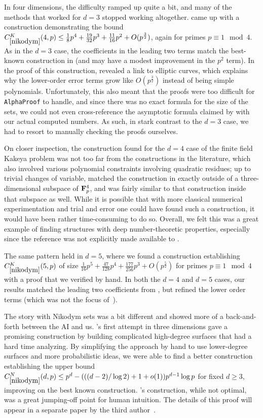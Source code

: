 In four dimensions, the difficulty ramped up quite a bit, and many of the methods that worked for $d=3$ stopped working altogether. \AlphaEvolve came up with a construction demonstrating the bound $C^K_{\ref{nikodym}}(4,p) \leq \frac{1}{8}p^4 + \frac{19}{32}p^3 + \frac{11}{16} p^2 + O(p^{\frac{3}{2}})$, again for primes $p\equiv 1\mod 4$.  As in the $d=3$ case, the coefficients in the leading two terms match the best-known construction in \cite{bukh-chao} (and may have a modest improvement in the $p^2$ term). In the proof of this construction, \DeepThink revealed a link to elliptic curves, which explains why the lower-order error terms grow like $O(p^{\frac{3}{2}})$ instead of being simple polynomials. Unfortunately, this also meant that the proofs were too difficult for \texttt{AlphaProof} to handle, and since there was no exact formula for the size of the sets, we could not even cross-reference the asymptotic formula claimed by \DeepThink with our actual computed numbers. As such, in stark contrast to the $d=3$ case, we had to resort to manually checking the proofs ourselves. 

On closer inspection, the construction \AlphaEvolve found for the $d=4$ case of the finite field Kakeya problem was not too far from the constructions in the literature, which also involved various polynomial constraints involving quadratic residues; up to trivial changes of variable,  \AlphaEvolve matched the construction in \cite{bukh-chao} exactly outside of a three-dimensional subspace of $\mathbf{F}_p^4$, and was fairly similar to that construction inside that subspace as well. While it is possible that with more classical numerical experimentation and trial and error one could have found such a construction, it would have been rather time-consuming to do so. Overall, we felt this was a great example of \AlphaEvolve finding structures with deep number-theoretic properties, especially since the reference \cite{bukh-chao} was not explicitly made available to \AlphaEvolve.

The same pattern held in $d=5$, where we found a construction establishing $C^K_{\ref{nikodym}}(5,p)$ of size $\frac{1}{16}p^5 + \frac{47}{128}p^4 + \frac{177}{256}p^3 + O(p^{\frac{5}{2}})$ for primes $p\equiv 1\mod 4$ with a \DeepThink proof that we verified by hand. In both the $d=4$ and $d=5$ cases, our results matched the leading two coefficients from \cite{bukh-chao}, but refined the lower order terms (which was not the focus of~\cite{bukh-chao}).

The story with Nikodym sets was a bit different and showed more of a back-and-forth between the AI and us.
\AlphaEvolve's first attempt in three dimensions gave a promising construction by building complicated high-degree surfaces that  \DeepThink had a hard time analyzing. By simplifying the approach by hand to use lower-degree surfaces and more probabilistic ideas, we were able to find a better construction establishing the upper bound $C^N_{\ref{nikodym}}(d,p) \leq p^d - (((d-2)/\log 2)+1+o(1)) p^{d-1} \log p$ for fixed $d \ge 3$, improving on the best known construction. \AlphaEvolve's construction, while not optimal, was a great jumping-off point for human intuition. The details of this proof will appear in a separate paper by the third author~\cite{tao-nikodym}.

